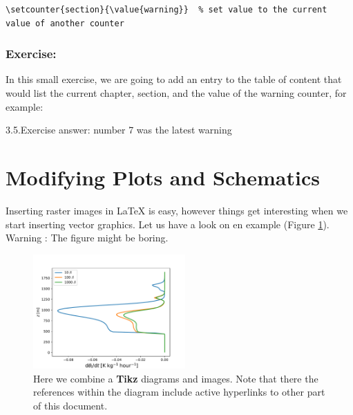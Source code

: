 \documentclass[a4paper,10pt]{report} %
\begin{document}
\begin{lstlisting}[language={[latex]tex}, frame=single,basicstyle=\footnotesize\color{darkgray}, 
  keywordstyle=\bf\color{magenta},
  commentstyle=\color{ForestGreen},  
  breaklines=true
  ]
\setcounter{section}{\value{warning}}  % set value to the current  value of another counter 
\end{lstlisting}

\subsubsection{Exercise:}
In this small exercise, we are going to add an entry to the table of content that would list the current chapter, section, and the value of the warning counter, for example:\\

\begin{center}
 3.5.Exercise answer: number 7 was the latest warning 
\end{center}




\newpage 
 \section{Modifying Plots and Schematics}\label{sec:figures}
 
 Inserting raster images in LaTeX is easy, however things get interesting when we start inserting vector graphics. Let us have a look on en example (Figure \ref{fig:figures}). Warning :  The figure might be boring.\\
 \begin{figure}[!ht] 
     \includegraphics[width=0.52\textwidth]{./figures/prof_tend.pdf}
        \caption[Diagrams and plots]{Here we combine a \textbf{Tikz} diagrams and images. Note that there the references within the diagram include active hyperlinks to other part of this document.}    
      \label{fig:figures}    
 \end{figure}
 
\end{document}
